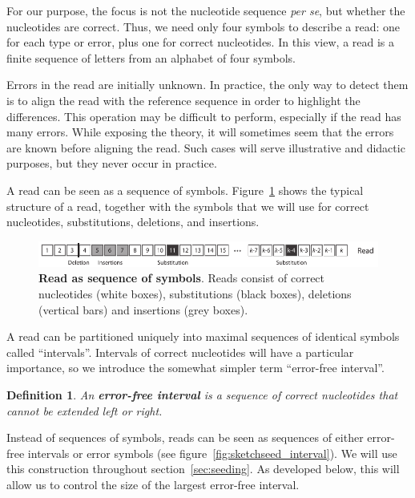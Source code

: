 \documentclass{article}
\newtheorem{definition}{Definition}
\begin{document}
For our purpose, the focus is not the nucleotide sequence \textit{per se},
but whether the nucleotides are correct. Thus, we need only four symbols
to describe a read: one for each type or error, plus one for correct
nucleotides. In this view, a read is a finite sequence of letters from an
alphabet of four symbols.

Errors in the read are initially unknown. In practice, the only way to
detect them is to align the read with the reference sequence in order to
highlight the differences. This operation may be difficult to perform,
especially if the read has many errors. While exposing the theory, it will
sometimes seem that the errors are known before aligning the read. Such
cases will serve illustrative and didactic purposes, but they never occur
in practice.

A read can be seen as a sequence of symbols. Figure~\ref{fig:sketchseed}
shows the typical structure of a read, together with the symbols that we
will use for correct nucleotides, substitutions, deletions, and
insertions.

\begin{figure}[h]
\centering
\includegraphics[scale=0.88]{sketch_seeding.pdf}
\caption{\textbf{Read as sequence of symbols}. Reads consist of
correct nucleotides (white boxes), substitutions (black boxes), deletions
(vertical bars) and insertions (grey boxes).}
\label{fig:sketchseed}
\end{figure}

A read can be partitioned uniquely into maximal sequences of identical
symbols called ``intervals''. Intervals of correct nucleotides will have a
particular importance, so we introduce the somewhat simpler term
``error-free interval''.

\begin{definition}
\label{def:error-free-interval}
An \textbf{error-free interval} is a sequence of correct nucleotides that
cannot be extended left or right.
\end{definition}

Instead of sequences of symbols, reads can be seen as sequences of either
error-free intervals or error symbols (see
figure~\ref{fig:sketchseed_interval}). We will use this construction
throughout section~\ref{sec:seeding}. As developed below, this will allow
us to control the size of the largest error-free interval.
\end{document}
